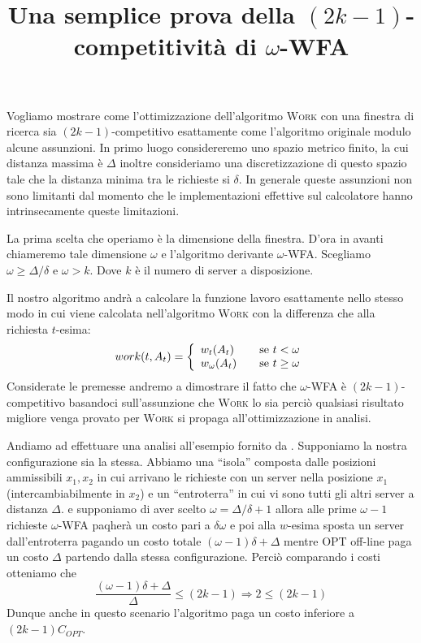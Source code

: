 \documentclass[a4paper, 11pt]{article}
\begin{document}
\title{Una semplice prova della $(2k - 1)$-competitività di $\omega$-WFA}
\maketitle

Vogliamo mostrare come l'ottimizzazione dell'algoritmo \textsc{Work} con una 
finestra di ricerca sia $(2k - 1)$-competitivo esattamente come l'algoritmo 
originale modulo alcune assunzioni. In primo luogo considereremo uno spazio
metrico finito, la cui distanza massima è $\Delta$ inoltre consideriamo una
discretizzazione di questo spazio tale che la distanza minima tra le richieste
si $\delta$. In generale queste assunzioni non sono limitanti dal momento che 
le implementazioni effettive sul calcolatore hanno intrinsecamente queste 
limitazioni.

La prima scelta che operiamo è la dimensione della finestra. D'ora in avanti 
chiameremo tale dimensione $\omega$ e l'algoritmo derivante $\omega$-WFA. 
Scegliamo $\omega \geq \Delta/\delta$ e $\omega > k$. Dove $k$ è il numero di 
server a disposizione. 

Il nostro algoritmo andrà a calcolare la funzione lavoro esattamente nello 
stesso modo in cui viene calcolata nell'algoritmo \textsc{Work} con la 
differenza che alla richiesta $t$-esima:
\[
    work(t, A_t) = 
    \left\{ \begin{array}{l l}
        w_t(A_t) & \quad \text{se } t < \omega\\
        w_\omega(A_t) & \quad \text{se } t \geq \omega \\
    \end{array}\right.
\]
Considerate le premesse andremo a dimostrare il fatto che $\omega$-WFA è 
$(2k - 1)$-competitivo basandoci sull'assunzione che \textsc{Work} lo sia
perciò qualsiasi risultato migliore venga provato per \textsc{Work} si propaga
all'ottimizzazione in analisi.

Andiamo ad effettuare una analisi all'esempio fornito
da \cite{rudec}. Supponiamo la nostra configurazione sia la stessa. Abbiamo una 
``isola'' composta dalle posizioni ammissibili $x_1, x_2$ in cui arrivano le 
richieste con un server nella posizione $x_1$ (intercambiabilmente in $x_2$) 
e un ``entroterra'' in cui vi sono tutti gli altri server a distanza $\Delta$. 
e supponiamo di aver scelto $\omega = \Delta / \delta + 1$ allora alle prime 
$\omega - 1$ richieste $\omega$-WFA paqherà un costo pari a $\delta \omega$ e 
poi alla $w$-esima sposta un server dall'entroterra pagando un costo totale 
$(\omega - 1)\delta + \Delta$ mentre OPT off-line paga un costo $\Delta$ 
partendo dalla stessa configurazione. Perciò comparando i costi otteniamo che 
\[
    \frac{(\omega - 1) \delta + \Delta}{\Delta} \leq (2k -1) \Rightarrow 
    2  \leq (2k - 1)
\]
Dunque anche in questo scenario l'algoritmo paga un costo inferiore 
a $(2k - 1)C_{OPT}$. 
\end{document}
